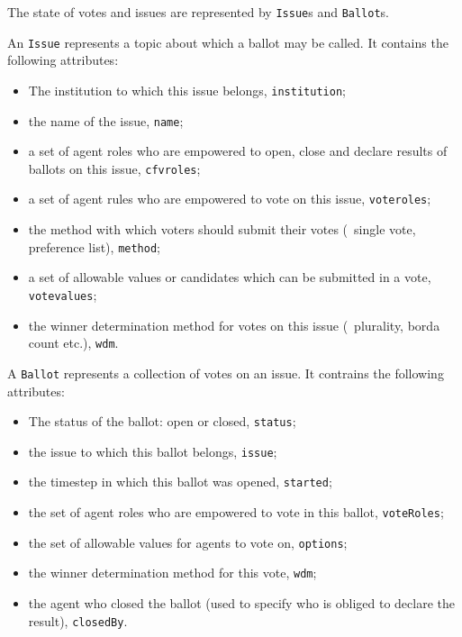 The state of votes and issues are represented by \texttt{Issue}s and \texttt{Ballot}s.

An \texttt{Issue} represents a topic about which a ballot may be called. It contains the following attributes:
\begin{itemize}
\item The institution to which this issue belongs, \texttt{institution};
\item the name of the issue, \texttt{name};
\item a set of agent roles who are empowered to open, close and declare results of ballots on this issue, \texttt{cfvroles};
\item a set of agent rules who are empowered to vote on this issue, \texttt{voteroles};
\item the method with which voters should submit their votes (\eg\ single vote, preference list), \texttt{method};
\item a set of allowable values or candidates which can be submitted in a vote, \texttt{votevalues};
\item the winner determination method for votes on this issue (\eg\ plurality, borda count etc.), \texttt{wdm}.
\end{itemize}

A \texttt{Ballot} represents a collection of votes on an issue. It contrains the following attributes:
\begin{itemize}
\item The status of the ballot: open or closed, \texttt{status};
\item the issue to which this ballot belongs, \texttt{issue};
\item the timestep in which this ballot was opened, \texttt{started};
\item the set of agent roles who are empowered to vote in this ballot, \texttt{voteRoles};
\item the set of allowable values for agents to vote on, \texttt{options};
\item the winner determination method for this vote, \texttt{wdm};
\item the agent who closed the ballot (used to specify who is obliged to declare the result), \texttt{closedBy}.
\end{itemize}

